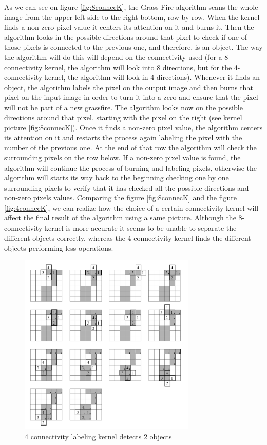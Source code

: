 As we can see on figure \eqref{fig:8connecK}, the Grass-Fire algorithm scans the whole image from the upper-left side to the right bottom, row by row. When the kernel finds a non-zero pixel value it centers its attention on it and burns it. Then the algorithm looks in the possible directions around that pixel to check if one of those pixels is connected to the previous one, and therefore, is an object. The way the algorithm will do this will depend on the connectivity used (for a 8-connectivity kernel, the algorithm will look into 8 directions, but for the 4-connectivity kernel, the algorithm will look in 4 directions).
Whenever it finds an object, the algorithm labels the pixel on the output image and then burns that pixel on the input image in order to turn it into a zero and ensure that the pixel will not be part of a new grassfire.
The algorithm looks now on the possible directions around that pixel, starting with the pixel on the right (see kernel picture \eqref{fig:8connecK}). Once it finds a non-zero pixel value, the algorithm centers its attention on it and restarts the process again labeling the pixel with the number of the previous one. At the end of that row the algorithm will check the surrounding pixels on the row below. If a non-zero pixel value is found, the algorithm will continue the process of burning and labeling pixels, otherwise the algorithm will starts its way back to the beginning checking one by one surrounding pixels to verify that it has checked all the possible directions and non-zero pixels values.
Comparing the figure \eqref{fig:8connecK} and the figure \eqref{fig:4connecK}, we can realize how the choice of a certain connectivity kernel will affect the final result of the algorithm using a same picture. Although the 8-connectivity kernel is more accurate it seems to be unable to separate the different objects correctly, whereas the 4-connectivity kernel finds the different objects performing less operations.

\begin{figure}[htbp]
\centering
\includegraphics[width=0.75\textwidth]{Pictures/Theory/4connec_kernel.png}
\caption{4 connectivity labeling kernel detects 2 objects}
\label{fig:4connecK}
\end{figure}



